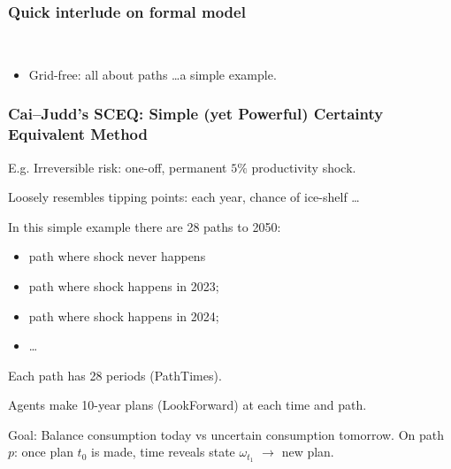\documentclass[handout,english]{beamer}
\begin{document}
\begin{frame}
  \frametitle{Quick interlude on formal model}
\\
\begin{itemize}
  \item Grid-free: all about paths \dots a simple example.
\end{itemize}

\vfill\end{frame}
\begin{frame}
  \frametitle{Cai--Judd's SCEQ: \small Simple (yet Powerful) Certainty
  Equivalent Method}
  E.g. Irreversible risk:  one-off, permanent $5\%$ productivity shock.

  Loosely resembles tipping points: each year, chance of ice-shelf \dots

  In this simple example there are 28 paths to 2050:
    \begin{itemize}\small
    \item path where shock never happens
    \item path where shock happens in 2023;
    \item path where shock happens in 2024;
    \item \dots
    \end{itemize}\normalsize
  Each path has 28 periods (PathTimes).

  Agents make 10-year plans (LookForward) at each time and path.
  
  \small
  Goal: Balance consumption today vs uncertain consumption tomorrow.
  On path $p$: once plan $t_0$ is made, time reveals state $\omega_{t_{1}}$
 $\rightarrow$ new plan.

\end{frame}
\end{document}
